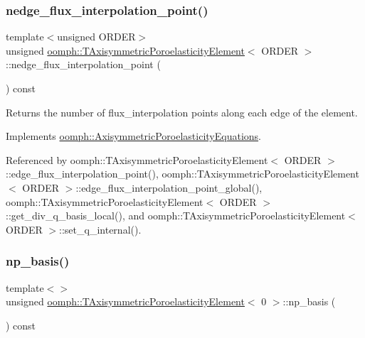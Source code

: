 \subsubsection{\texorpdfstring{nedge\+\_\+flux\+\_\+interpolation\+\_\+point()}{nedge\_flux\_interpolation\_point()}\hspace{0.1cm}{\footnotesize\ttfamily [3/3]}}
{\footnotesize\ttfamily template$<$unsigned O\+R\+D\+ER$>$ \\
unsigned \hyperlink{classoomph_1_1TAxisymmetricPoroelasticityElement}{oomph\+::\+T\+Axisymmetric\+Poroelasticity\+Element}$<$ O\+R\+D\+ER $>$\+::nedge\+\_\+flux\+\_\+interpolation\+\_\+point (\begin{DoxyParamCaption}{ }\end{DoxyParamCaption}) const\hspace{0.3cm}{\ttfamily [virtual]}}



Returns the number of flux\+\_\+interpolation points along each edge of the element. 



Implements \hyperlink{classoomph_1_1AxisymmetricPoroelasticityEquations_a16d82c2d6bf7f84f6529f4182f83e6ef}{oomph\+::\+Axisymmetric\+Poroelasticity\+Equations}.



Referenced by oomph\+::\+T\+Axisymmetric\+Poroelasticity\+Element$<$ O\+R\+D\+E\+R $>$\+::edge\+\_\+flux\+\_\+interpolation\+\_\+point(), oomph\+::\+T\+Axisymmetric\+Poroelasticity\+Element$<$ O\+R\+D\+E\+R $>$\+::edge\+\_\+flux\+\_\+interpolation\+\_\+point\+\_\+global(), oomph\+::\+T\+Axisymmetric\+Poroelasticity\+Element$<$ O\+R\+D\+E\+R $>$\+::get\+\_\+div\+\_\+q\+\_\+basis\+\_\+local(), and oomph\+::\+T\+Axisymmetric\+Poroelasticity\+Element$<$ O\+R\+D\+E\+R $>$\+::set\+\_\+q\+\_\+internal().

\mbox{\label{classoomph_1_1TAxisymmetricPoroelasticityElement_ab0ba7323f782f19c961bb5ccec22aea3}} 
\subsubsection{\texorpdfstring{np\+\_\+basis()}{np\_basis()}\hspace{0.1cm}{\footnotesize\ttfamily [1/3]}}
{\footnotesize\ttfamily template$<$$>$ \\
unsigned \hyperlink{classoomph_1_1TAxisymmetricPoroelasticityElement}{oomph\+::\+T\+Axisymmetric\+Poroelasticity\+Element}$<$ 0 $>$\+::np\+\_\+basis (\begin{DoxyParamCaption}{ }\end{DoxyParamCaption}) const\hspace{0.3cm}{\ttfamily [virtual]}}



